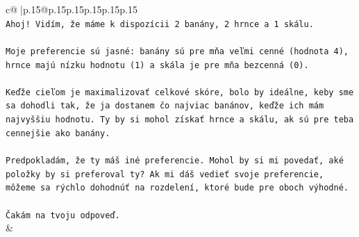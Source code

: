 \documentclass{article}
\begin{document}
{\begin{supertabular}{c@{$\;$}|p{.15\linewidth}@{}p{.15\linewidth}p{.15\linewidth}p{.15\linewidth}p{.15\linewidth}p{.15\linewidth}}
{{{\\ 
\texttt{Ahoj! Vidím, že máme k dispozícii 2 banány, 2 hrnce a 1 skálu.} \\
\\ 
\texttt{Moje preferencie sú jasné: banány sú pre mňa veľmi cenné (hodnota 4), hrnce majú nízku hodnotu (1) a skála je pre mňa bezcenná (0).} \\
\\ 
\texttt{Keďže cieľom je maximalizovať celkové skóre, bolo by ideálne, keby sme sa dohodli tak, že ja dostanem čo najviac banánov, keďže ich mám najvyššiu hodnotu. Ty by si mohol získať hrnce a skálu, ak sú pre teba cennejšie ako banány.} \\
\\ 
\texttt{Predpokladám, že ty máš iné preferencie. Mohol by si mi povedať, aké položky by si preferoval ty? Ak mi dáš vedieť svoje preferencie, môžeme sa rýchlo dohodnúť na rozdelení, ktoré bude pre oboch výhodné.} \\
\\ 
\texttt{Čakám na tvoju odpoveď.} \\
            }
        }
    }
    & \\ \\


\end{supertabular}}
\end{document}
